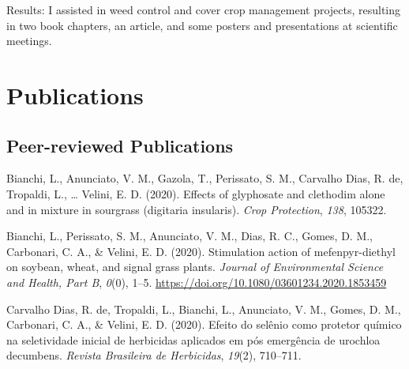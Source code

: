 \documentclass[11pt, a4paper]{awesome-cv}
\begin{document}
\begin{cventries}
{\begin{cvitems}
\item Results: I assisted in weed control and cover crop management projects, resulting in two book chapters, an article, and some posters and presentations at scientific meetings.
\end{cvitems}}
\end{cventries}

\hypertarget{publications}{%
\section{Publications}\label{publications}}

\hypertarget{peer-reviewed-publications}{%
\subsection{Peer-reviewed
Publications}\label{peer-reviewed-publications}}

\hypertarget{refs_journals}{}
\leavevmode\hypertarget{ref-bianchi2020effects}{}%
Bianchi, L., Anunciato, V. M., Gazola, T., Perissato, S. M., Carvalho
Dias, R. de, Tropaldi, L., \ldots{} Velini, E. D. (2020). Effects of
glyphosate and clethodim alone and in mixture in sourgrass (digitaria
insularis). \emph{Crop Protection}, \emph{138}, 105322.

\leavevmode\hypertarget{ref-doi:10.1080ux2f03601234.2020.1853459}{}%
Bianchi, L., Perissato, S. M., Anunciato, V. M., Dias, R. C., Gomes, D.
M., Carbonari, C. A., \& Velini, E. D. (2020). Stimulation action of
mefenpyr-diethyl on soybean, wheat, and signal grass plants.
\emph{Journal of Environmental Science and Health, Part B}, \emph{0}(0),
1--5. \url{https://doi.org/10.1080/03601234.2020.1853459}

\leavevmode\hypertarget{ref-de2020efeito}{}%
Carvalho Dias, R. de, Tropaldi, L., Bianchi, L., Anunciato, V. M.,
Gomes, D. M., Carbonari, C. A., \& Velini, E. D. (2020). Efeito do
sel{ê}nio como protetor qu{í}mico na seletividade inicial de herbicidas
aplicados em p{ó}s emerg{ê}ncia de urochloa decumbens. \emph{Revista
Brasileira de Herbicidas}, \emph{19}(2), 710--711.
\end{document}
